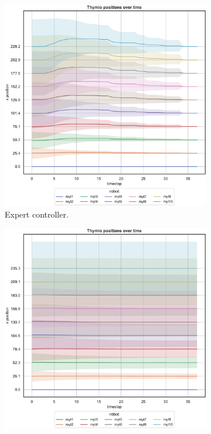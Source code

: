\begin{figure}[!htb]
	\begin{center}
		\begin{subfigure}[h]{0.325\textwidth}
			\centering
			\includegraphics[width=\textwidth]{contents/images/net-d18/N10/position-overtime-omniscient}%
			\caption{Expert controller.}
		\end{subfigure}
		\hfill
	\begin{subfigure}[h]{0.325\textwidth}
		\centering
		\includegraphics[width=\textwidth]{contents/images/net-d18/N10/position-overtime-manual}%

\end{subfigure}
\end{center}
\end{figure}
